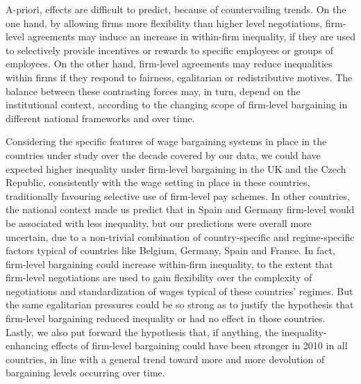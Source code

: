 \documentclass[Review,times,sageh,11pt]{sagej}
\begin{document}
A-priori, effects are difficult to predict, because of countervailing trends. On the one hand, by allowing firms more flexibility than higher level negotiations, firm-level agreements may induce an increase in within-firm inequality, if they are used to selectively provide incentives or rewards to specific employees or groups of employees. On the other hand, firm-level agreements may reduce inequalities within firms if they respond to fairness, egalitarian or redistributive motives. The balance between these contrasting forces may, in turn, depend on the institutional context, according to the changing scope of firm-level bargaining in different national frameworks and over time.

Considering the specific features of wage bargaining systems in place in the countries under study over the decade covered by our data, we could have expected higher inequality under firm-level bargaining in the UK and the Czech Republic, consistently with the wage setting in place in these countries, traditionally favouring selective use of firm-level pay schemes. In other countries, the national context made us predict that in Spain and Germany firm-level would be associated with less inequality, but our predictions were overall more uncertain, due to a non-trivial combination of country-specific and regime-specific factors typical of countries like Belgium, Germany, Spain and France. In fact, firm-level bargaining could increase within-firm inequality, to the extent that firm-level negotiations are used to gain flexibility over the complexity of negotiations and standardization of wages typical of these countries' regimes. But the same egalitarian pressures could be so strong as to justify the hypothesis that firm-level bargaining reduced inequality or had no effect in those countries. Lastly, we also put forward the hypothesis that, if anything, the inequality-enhancing effects of firm-level bargaining could have been stronger in 2010 in all countries, in line with a general trend toward more and more devolution of bargaining levels occurring over time.
\end{document}
